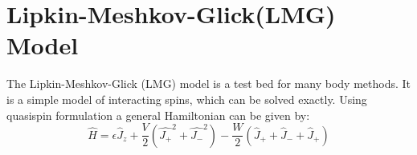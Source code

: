 \section{Lipkin-Meshkov-Glick(LMG) Model}
The Lipkin-Meshkov-Glick (LMG) model is a test bed for many body methods. It is a simple model of interacting spins, which can be solved exactly. Using quasispin formulation a general Hamiltonian can be given by: 
\begin{equation}
	\hat H = \epsilon \hat J_z + \frac{V}{2} \left( \hat{J_+}^2 + \hat{J_-}^2 \right) - \frac{W}{2} \left( \hat J_+ + \hat  J_- + \hat J_+\right) 
\end{equation}
